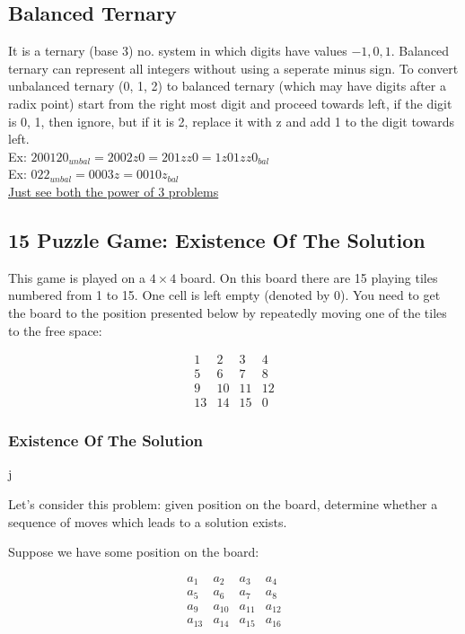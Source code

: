 \documentclass[8pt, a4paper, oneside, twocolumn]{extarticle}
\begin{document}
\subsection{Balanced Ternary}
It is a ternary (base 3) no. system in which digits have values $-1, 0, 1$. Balanced ternary can represent all integers without using a seperate minus sign. To convert unbalanced ternary (0, 1, 2) to balanced ternary (which may have digits after a radix point) start from the right most digit and proceed towards left, if the digit is 0, 1, then ignore, but if it is 2, replace it with z and add 1 to the digit towards left.
\\Ex: $200120_{unbal} = 2002z0 = 201zz0 = 1z01zz0_{bal}$
\\Ex: $022_{unbal} = 0003z = 0010z_{bal}$
\\\href{https://apps.topcoder.com/wiki/display/tc/SRM+604}{Just see both the power of 3 problems}
\subsection{15 Puzzle Game: Existence Of The Solution}

This game is played on a $4 \times 4$ board. On this board there are 15 playing tiles numbered from 1 to 15. One cell is left empty (denoted by 0). You need to get the board to the position presented below by repeatedly moving one of the tiles to the free space:

$$\begin{matrix} 1 & 2 & 3 & 4 \\ 5 & 6 & 7 & 8 \\ 9 & 10 & 11 & 12 \\ 13 & 14 & 15 & 0 \end{matrix}$$

\subsubsection{Existence Of The Solution}j

Let's consider this problem: given position on the board, determine whether a sequence of moves which leads to a solution exists.

Suppose we have some position on the board:

$$\begin{matrix} a_1 & a_2 & a_3 & a_4 \\ a_5 & a_6 & a_7 & a_8 \\ a_9 & a_{10} & a_{11} & a_{12} \\ a_{13} & a_{14} & a_{15} & a_{16} \end{matrix}$$
\end{document}
